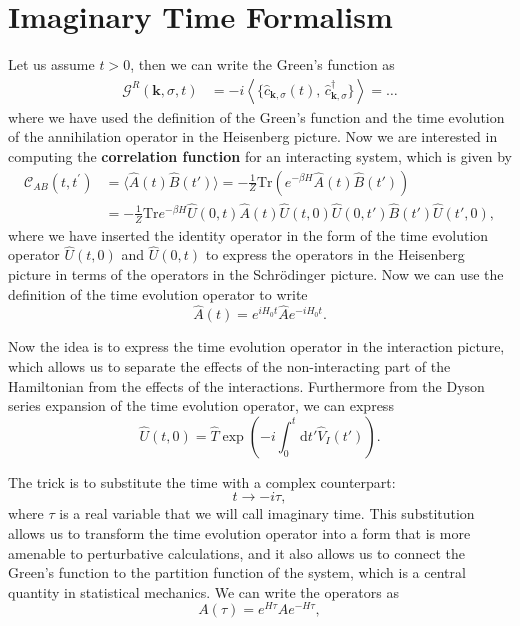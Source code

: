 \section{Imaginary Time Formalism}

Let us assume \(t>0\), then we can write the Green's function as
\[
    \begin{aligned}
        \mathcal{G}^R(\mathbf{k}, \sigma, t) & = -i \left\langle \{ \hat{c}_{\mathbf{k}, \sigma} (t),\, \hat{c}_{\mathbf{k}, \sigma}^\dagger \} \right\rangle = \dots
    \end{aligned}
\]
where we have used the definition of the Green's function and the time evolution of the annihilation operator in the Heisenberg picture. Now we are interested in computing the \textbf{correlation function} for an interacting system, which is given by
\[
    \begin{aligned}
        \mathcal{C}_{AB}(t,t^{\prime}) & = \langle \hat{A}(t) \hat{B}(t') \rangle = - \frac{1}{Z} \mathrm{Tr} \left( e^{-\beta H} \hat{A}(t) \hat{B}(t') \right) \\
                                       & = -\frac{1}{Z} \mathrm{Tr} e^{- \beta H} \hat{U}(0,t) \hat{A}(t) \hat{U}(t,0) \hat{U}(0,t') \hat{B}(t') \hat{U}(t',0),
    \end{aligned}
\]
where we have inserted the identity operator in the form of the time evolution operator \(\hat{U}(t,0)\) and \(\hat{U}(0,t)\) to express the operators in the Heisenberg picture in terms of the operators in the Schrödinger picture. Now we can use the definition of the time evolution operator to write
\[
    \hat{A} (t) = e^{i H_0 t} \hat{A} e^{-i H_0 t}.
\]

Now the idea is to express the time evolution operator in the interaction picture, which allows us to separate the effects of the non-interacting part of the Hamiltonian from the effects of the interactions. Furthermore from the Dyson series expansion of the time evolution operator, we can express
\[
    \hat{U}(t,0) = \hat{T} \exp\left( -i \int_0^t \mathrm{d} t' \hat{V}_I(t') \right).
\]

The trick is to substitute the time with a complex counterpart:
\[
    t \rightarrow - i \tau,
\]
where \(\tau\) is a real variable that we will call imaginary time. This substitution allows us to transform the time evolution operator into a form that is more amenable to perturbative calculations, and it also allows us to connect the Green's function to the partition function of the system, which is a central quantity in statistical mechanics. We can write the operators as
\[
    A(\tau) = e^{H \tau} A e^{-H \tau},
\]

